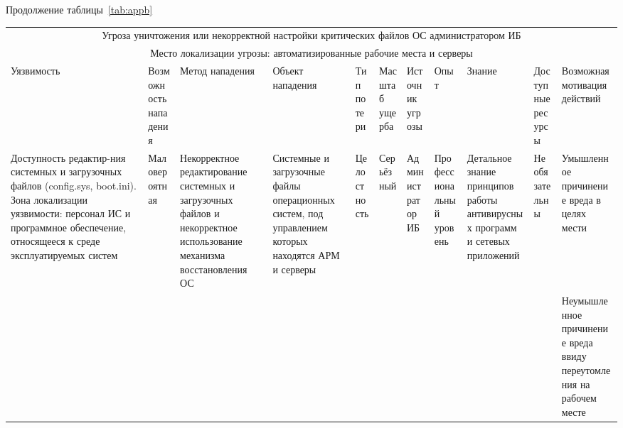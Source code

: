 \begin{sidewaystable}[h]
Продолжение таблицы~\ref{tab:appb}
\small
  \begin{longtable}{|p{2.7cm}|p{1.5cm}|p{2cm}|p{2cm}|p{1.5cm}|p{1.5cm}|p{1.5cm}|p{1.5cm}|p{3cm}|p{2cm}|p{2cm}|}
    \hline
    \multicolumn{11}{|c|}{Угроза уничтожения или некорректной настройки критических файлов ОС администратором ИБ}\\
    \multicolumn{11}{|c|}{Место локализации угрозы: автоматизированные рабочие места и серверы}\\\hline
    Уязвимость & Возмож\-ность нападения & Метод нападения & Объект
    нападения & Тип потери & Масш\-таб ущерба & Источник угрозы & Опыт &
    Знание & Доступные ресурсы & Возможная мотивация действий\\\hline
    \multirow{2}{3cm}{Доступность редактир-ния системных и загрузочных файлов 
      (config.sys, boot.ini). Зона локализации уязвимости: персонал ИС
      и программное обеспечение, относящееся к среде эксплуатируемых
      систем} & Малове\-роятная & Некоррек\-тное редактирование
    системных и загрузочных файлов и некорректное использование
    механизма восстановления ОС   &  Системные и загрузочные файлы
    операционных систем, под управлением которых находятся АРМ и
    серверы  & Целост\-ность & Серь\-ёз\-ный &
  Админи\-стратор ИБ & Профес\-сиональ\-ный уровень
  & Детальное знание принципов работы антивирусных программ и сетевых
  приложений & Не обязательны & Умышлен\-ное причинение вреда в
  целях мести\\\cline{11-11}
  &&&&&&&&&& Неумыш\-ленное причинение вреда ввиду переутомления на
  рабочем месте \\\hline
  \end{longtable}
\end{sidewaystable}
\newpage

\newpage

